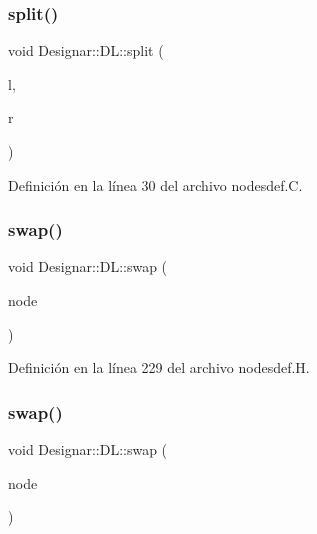 \mbox{\label{class_designar_1_1_d_l_a81ed81ffd61fde1419fb4fb87ba551e3}} 
\subsubsection{\texorpdfstring{split()}{split()}}
{\footnotesize\ttfamily void Designar\+::\+D\+L\+::split (\begin{DoxyParamCaption}\item[{\hyperlink{class_designar_1_1_d_l}{DL} \&}]{l,  }\item[{\hyperlink{class_designar_1_1_d_l}{DL} \&}]{r }\end{DoxyParamCaption})}



Definición en la línea 30 del archivo nodesdef.\+C.

\mbox{\label{class_designar_1_1_d_l_a3a6b3f9fe3da01008ebf5f60bdf20bbc}} 
\subsubsection{\texorpdfstring{swap()}{swap()}\hspace{0.1cm}{\footnotesize\ttfamily [1/2]}}
{\footnotesize\ttfamily void Designar\+::\+D\+L\+::swap (\begin{DoxyParamCaption}\item[{\hyperlink{class_designar_1_1_d_l}{DL} $\ast$}]{node }\end{DoxyParamCaption})\hspace{0.3cm}{\ttfamily [inline]}}



Definición en la línea 229 del archivo nodesdef.\+H.

\mbox{\label{class_designar_1_1_d_l_a7b32539230a7ce8c23a8439bac4f3a12}} 
\subsubsection{\texorpdfstring{swap()}{swap()}\hspace{0.1cm}{\footnotesize\ttfamily [2/2]}}
{\footnotesize\ttfamily void Designar\+::\+D\+L\+::swap (\begin{DoxyParamCaption}\item[{\hyperlink{class_designar_1_1_d_l}{DL} \&}]{node }\end{DoxyParamCaption})\hspace{0.3cm}{\ttfamily [inline]}}



